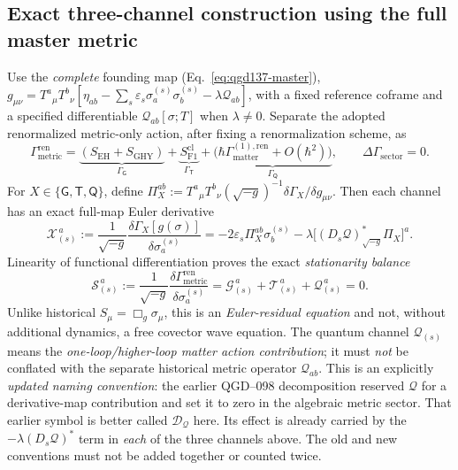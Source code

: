 \documentclass[11pt,a4paper]{article}
\begin{document}
\subsection{Exact three-channel construction using the full master metric}
Use the \emph{complete} founding map (Eq.~\ref{eq:qgd137-master}),
$g_{\mu\nu}=T^a{}_{\mu}T^b{}_{\nu}[\eta_{ab}-\sum_s
\varepsilon_s\sigma_a^{(s)}\sigma_b^{(s)}-\lambda\mathcal Q_{ab}]$,
with a fixed reference coframe and a specified differentiable
$\mathcal Q_{ab}[\sigma;T]$ when $\lambda\ne0$.
Separate the adopted renormalized metric-only action, after fixing a
renormalization scheme, as
\begin{equation}\label{eq:qgd141-splitaction}
\Gamma_{\mathrm{metric}}^{\mathrm{ren}}=
\underbrace{(S_{\mathrm{EH}}+S_{\mathrm{GHY}})}_{\Gamma_{\mathsf G}}
+\underbrace{S_{\mathrm{F1}}^{\mathrm{cl}}}_{\Gamma_{\mathsf T}}
+\underbrace{\bigl(\hbar\Gamma_{\mathrm{matter}}^{(1),\mathrm{ren}}
+O(\hbar^2)\bigr)}_{\Gamma_{\mathsf Q}},
\qquad \Delta\Gamma_{\mathrm{sector}}=0.
\end{equation}
For $X\in\{\mathsf G,\mathsf T,\mathsf Q\}$, define
$\Pi_X^{ab}:=T^a{}_{\mu}T^b{}_{\nu}
(\sqrt{-g})^{-1}\delta\Gamma_X/\delta g_{\mu\nu}$.
Then each channel has an exact full-map Euler derivative
\begin{equation}\label{eq:qgd141-channels}
\boxed{\mathscr X_{(s)}^{\,a}:=\frac{1}{\sqrt{-g}}
\frac{\delta\Gamma_X[g(\sigma)]}{\delta\sigma_a^{(s)}}
=-2\varepsilon_s\Pi_X^{ab}\sigma_b^{(s)}
-\lambda\bigl[(D_s\mathcal Q)^*_{\sqrt{-g}}\Pi_X\bigr]^a.}
\end{equation}
Linearity of functional differentiation proves the exact
\emph{stationarity balance}
\begin{equation}\label{eq:qgd141-balance}
\boxed{\mathscr S_{(s)}^{\,a}
:=\frac{1}{\sqrt{-g}}\frac{\delta\Gamma_{\mathrm{metric}}^{\mathrm{ren}}}
{\delta\sigma_a^{(s)}}
=\mathscr G_{(s)}^{\,a}+\mathscr T_{(s)}^{\,a}
+\mathscr Q_{(s)}^{\,a}=0.}
\end{equation}
Unlike historical $S_\mu=\Box_g\sigma_\mu$, this is an
\emph{Euler-residual equation} and not, without additional dynamics,
a free covector wave equation. The quantum channel
$\mathscr Q_{(s)}$ means the \emph{one-loop/higher-loop matter action
contribution}; it must \emph{not} be conflated with the separate
historical metric operator $\mathcal Q_{ab}$. This is an explicitly
\emph{updated naming convention}: the earlier QGD--098 decomposition
reserved $\mathscr Q$ for a derivative-map contribution and set
it to zero in the algebraic metric sector. That earlier symbol is
better called $\mathscr D_{\mathcal Q}$ here. Its effect is
already carried by the $-\lambda(D_s\mathcal Q)^*$ term in
\emph{each} of the three channels above. The old and new conventions
must not be added together or counted twice.
\end{document}
